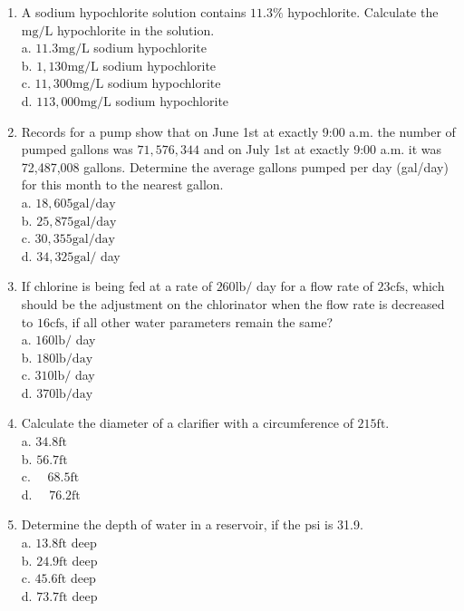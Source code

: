 \documentclass[10pt]{article}
\begin{document}
\begin{enumerate}
  \item A sodium hypochlorite solution contains $11.3 \%$ hypochlorite. Calculate the $\mathrm{mg} / \mathrm{L}$ hypochlorite in the solution.\\
a. $11.3 \mathrm{mg} / \mathrm{L}$ sodium hypochlorite\\
b. $1,130 \mathrm{mg} / \mathrm{L}$ sodium hypochlorite\\
c. $11,300 \mathrm{mg} / \mathrm{L}$ sodium hypochlorite\\
d. $113,000 \mathrm{mg} / \mathrm{L}$ sodium hypochlorite

  \item Records for a pump show that on June 1st at exactly 9:00 a.m. the number of pumped gallons was $71,576,344$ and on July 1st at exactly 9:00 a.m. it was 72,487,008 gallons. Determine the average gallons pumped per day (gal/day) for this month to the nearest gallon.\\
a. $18,605 \mathrm{gal} / \mathrm{day}$\\
b. $25,875 \mathrm{gal} / \mathrm{day}$\\
c. $30,355 \mathrm{gal} / \mathrm{day}$\\
d. $34,325 \mathrm{gal} /$ day 

\item If chlorine is being fed at a rate of $260 \mathrm{lb} /$ day for a flow rate of $23 \mathrm{cfs}$, which should be the adjustment on the chlorinator when the flow rate is decreased to $16 \mathrm{cfs}$, if all other water parameters remain the same?\\
a. $160 \mathrm{lb} /$ day\\
b. $180 \mathrm{lb} / \mathrm{day}$\\
c. $310 \mathrm{lb} /$ day\\
d. $370 \mathrm{lb} / \mathrm{day}$

  \item Calculate the diameter of a clarifier with a circumference of $215 \mathrm{ft}$.\\
a. $34.8 \mathrm{ft}$\\
b. $56.7 \mathrm{ft}$\\
c. $\quad 68.5 \mathrm{ft}$\\
d. $\quad 76.2 \mathrm{ft}$

  \item Determine the depth of water in a reservoir, if the psi is 31.9.\\
a. $13.8 \mathrm{ft}$ deep\\
b. $24.9 \mathrm{ft}$ deep\\
c. $45.6 \mathrm{ft}$ deep\\
d. $73.7 \mathrm{ft}$ deep


\end{enumerate}
\end{document}
